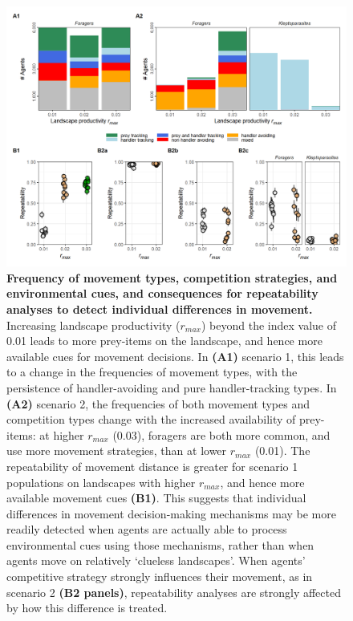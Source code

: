     \begin{figure}[h!]
        \centering
        \includegraphics[width=1.0\textwidth]{figures/patternprocess/fig_03.png}
        \caption{
            \textbf{Frequency of movement types, competition strategies, and environmental cues, and consequences for repeatability analyses to detect individual differences in movement.}
            Increasing landscape productivity ($r_{max}$) beyond the index value of 0.01 leads to more prey-items on the landscape, and hence more available cues for movement decisions.
            In \textbf{(A1)} scenario 1, this leads to a change in the frequencies of movement types, with the persistence of handler-avoiding and pure handler-tracking types.
            In \textbf{(A2)} scenario 2, the frequencies of both movement types and competition types change with the increased availability of prey-items: at higher $r_{max}$ (0.03), foragers are both more common, and use more movement strategies, than at lower $r_{max}$ (0.01).
            The repeatability of movement distance is greater for scenario 1 populations on landscapes with higher $r_{max}$, and hence more available movement cues \textbf{(B1)}.
            This suggests that individual differences in movement decision-making mechanisms may be more readily detected when agents are actually able to process environmental cues using those mechanisms, rather than when agents move on relatively `clueless landscapes'.
            When agents' competitive strategy strongly influences their movement, as in scenario 2 \textbf{(B2 panels)}, repeatability analyses are strongly affected by how this difference is treated.
}
\end{figure}
